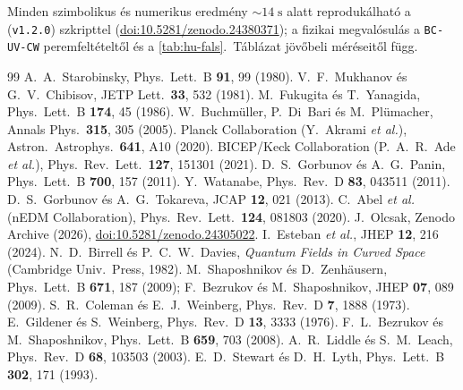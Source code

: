 \documentclass[11pt,a4paper]{article}
\begin{document}
Minden szimbolikus és numerikus eredmény $\sim 14\;\mathrm{s}$ alatt reprodukálható a  (\texttt{v1.2.0}) szkripttel (\href{https://doi.org/10.5281/zenodo.24380371}{doi:10.5281/zenodo.24380371}); a fizikai megvalósulás a \texttt{BC-UV-CW} peremfeltételtől és a \ref{tab:hu-fals}.\ Táblázat jövőbeli méréseitől függ.

\begingroup\small
\begin{thebibliography}{99}
 A.~A.~Starobinsky, Phys.\ Lett.\ B \textbf{91}, 99 (1980).
 V.~F.~Mukhanov és G.~V.~Chibisov, JETP Lett.\ \textbf{33}, 532 (1981).
 M.~Fukugita és T.~Yanagida, Phys.\ Lett.\ B \textbf{174}, 45 (1986).
 W.~Buchm\"uller, P.~Di~Bari és M.~Pl\"umacher, Annals Phys.\ \textbf{315}, 305 (2005).
 Planck Collaboration (Y.~Akrami \textit{et al.}), Astron.\ Astrophys.\ \textbf{641}, A10 (2020).
 BICEP/Keck Collaboration (P.~A.~R.~Ade \textit{et al.}), Phys.\ Rev.\ Lett.\ \textbf{127}, 151301 (2021).
 D.~S.~Gorbunov és A.~G.~Panin, Phys.\ Lett.\ B \textbf{700}, 157 (2011).
 Y.~Watanabe, Phys.\ Rev.\ D \textbf{83}, 043511 (2011).
 D.~S.~Gorbunov és A.~G.~Tokareva, JCAP \textbf{12}, 021 (2013).
 C.~Abel \textit{et al.} (nEDM Collaboration), Phys.\ Rev.\ Lett.\ \textbf{124}, 081803 (2020).
 J.~Olcsak, Zenodo Archive (2026), \href{https://doi.org/10.5281/zenodo.24305022}{doi:10.5281/zenodo.24305022}.
 I.~Esteban \textit{et al.}, JHEP \textbf{12}, 216 (2024).
 N.~D.~Birrell és P.~C.~W.~Davies, \textit{Quantum Fields in Curved Space} (Cambridge Univ.\ Press, 1982).
 M.~Shaposhnikov és D.~Zenh\"ausern, Phys.\ Lett.\ B \textbf{671}, 187 (2009); F.~Bezrukov és M.~Shaposhnikov, JHEP \textbf{07}, 089 (2009).
 S.~R.~Coleman és E.~J.~Weinberg, Phys.\ Rev.\ D \textbf{7}, 1888 (1973).
 E.~Gildener és S.~Weinberg, Phys.\ Rev.\ D \textbf{13}, 3333 (1976).
 F.~L.~Bezrukov és M.~Shaposhnikov, Phys.\ Lett.\ B \textbf{659}, 703 (2008).
 A.~R.~Liddle és S.~M.~Leach, Phys.\ Rev.\ D \textbf{68}, 103503 (2003).
 E.~D.~Stewart és D.~H.~Lyth, Phys.\ Lett.\ B \textbf{302}, 171 (1993).

\end{thebibliography}
\end{document}
